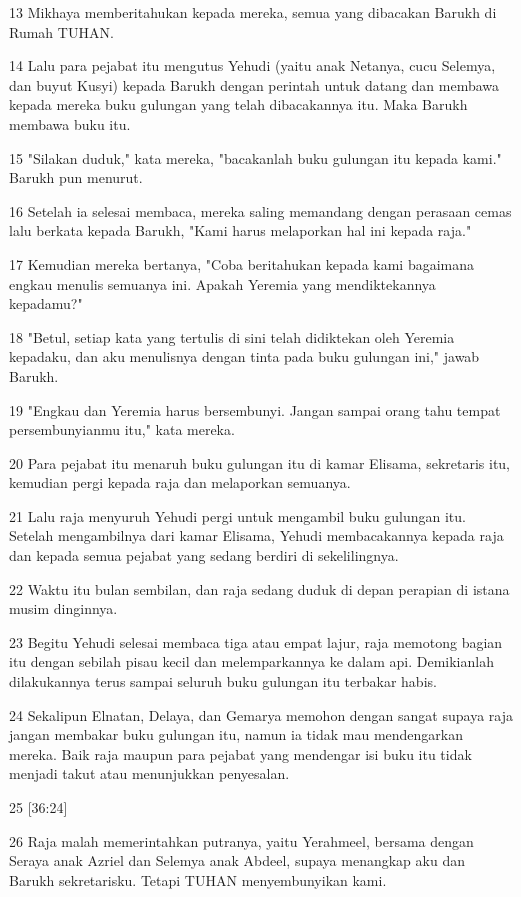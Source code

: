 \par 13 Mikhaya memberitahukan kepada mereka, semua yang dibacakan Barukh di Rumah TUHAN.
\par 14 Lalu para pejabat itu mengutus Yehudi (yaitu anak Netanya, cucu Selemya, dan buyut Kusyi) kepada Barukh dengan perintah untuk datang dan membawa kepada mereka buku gulungan yang telah dibacakannya itu. Maka Barukh membawa buku itu.
\par 15 "Silakan duduk," kata mereka, "bacakanlah buku gulungan itu kepada kami." Barukh pun menurut.
\par 16 Setelah ia selesai membaca, mereka saling memandang dengan perasaan cemas lalu berkata kepada Barukh, "Kami harus melaporkan hal ini kepada raja."
\par 17 Kemudian mereka bertanya, "Coba beritahukan kepada kami bagaimana engkau menulis semuanya ini. Apakah Yeremia yang mendiktekannya kepadamu?"
\par 18 "Betul, setiap kata yang tertulis di sini telah didiktekan oleh Yeremia kepadaku, dan aku menulisnya dengan tinta pada buku gulungan ini," jawab Barukh.
\par 19 "Engkau dan Yeremia harus bersembunyi. Jangan sampai orang tahu tempat persembunyianmu itu," kata mereka.
\par 20 Para pejabat itu menaruh buku gulungan itu di kamar Elisama, sekretaris itu, kemudian pergi kepada raja dan melaporkan semuanya.
\par 21 Lalu raja menyuruh Yehudi pergi untuk mengambil buku gulungan itu. Setelah mengambilnya dari kamar Elisama, Yehudi membacakannya kepada raja dan kepada semua pejabat yang sedang berdiri di sekelilingnya.
\par 22 Waktu itu bulan sembilan, dan raja sedang duduk di depan perapian di istana musim dinginnya.
\par 23 Begitu Yehudi selesai membaca tiga atau empat lajur, raja memotong bagian itu dengan sebilah pisau kecil dan melemparkannya ke dalam api. Demikianlah dilakukannya terus sampai seluruh buku gulungan itu terbakar habis.
\par 24 Sekalipun Elnatan, Delaya, dan Gemarya memohon dengan sangat supaya raja jangan membakar buku gulungan itu, namun ia tidak mau mendengarkan mereka. Baik raja maupun para pejabat yang mendengar isi buku itu tidak menjadi takut atau menunjukkan penyesalan.
\par 25 [36:24]
\par 26 Raja malah memerintahkan putranya, yaitu Yerahmeel, bersama dengan Seraya anak Azriel dan Selemya anak Abdeel, supaya menangkap aku dan Barukh sekretarisku. Tetapi TUHAN menyembunyikan kami.
